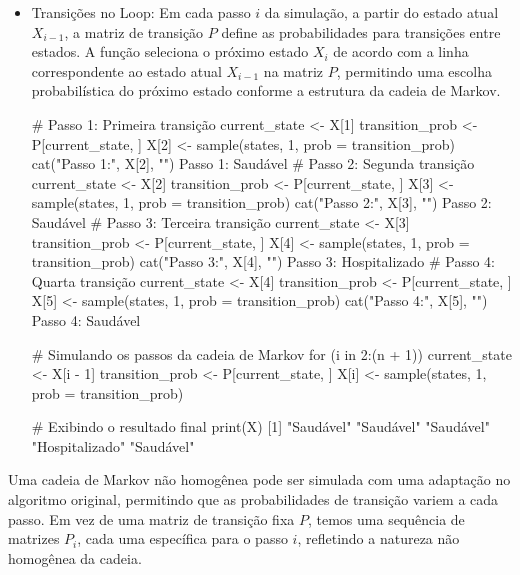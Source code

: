 \documentclass[12pt, a4paper, openany]{book}
\numberwithin{equation}{chapter}
\numberwithin{table}{chapter}
\numberwithin{figure}{chapter}
\theoremstyle{break}
\begin{document}
\begin{itemize}
   
   \item Transições no Loop: Em cada passo \( i \) da simulação, a partir do estado atual \( X_{i-1} \), a matriz de transição \( P \) define as probabilidades para transições entre estados. A função seleciona o próximo estado \( X_i \) de acordo com a linha correspondente ao estado atual \( X_{i-1} \) na matriz \( P \), permitindo uma escolha probabilística do próximo estado conforme a estrutura da cadeia de Markov. 



\begin{RCodeBox}

# Passo 1: Primeira transição
current_state <- X[1]
transition_prob <- P[current_state, ]
X[2] <- sample(states, 1, prob = transition_prob)
cat("Passo 1:", X[2], "\n")
Passo 1: Saudável 
# Passo 2: Segunda transição
current_state <- X[2]
transition_prob <- P[current_state, ]
X[3] <- sample(states, 1, prob = transition_prob)
cat("Passo 2:", X[3], "\n")
Passo 2: Saudável 
# Passo 3: Terceira transição
current_state <- X[3]
transition_prob <- P[current_state, ]
X[4] <- sample(states, 1, prob = transition_prob)
cat("Passo 3:", X[4], "\n")
Passo 3: Hospitalizado 
# Passo 4: Quarta transição
current_state <- X[4]
transition_prob <- P[current_state, ]
X[5] <- sample(states, 1, prob = transition_prob)
cat("Passo 4:", X[5], "\n")
Passo 4: Saudável 

\end{RCodeBox}




\begin{RCodeBox}

# Simulando os passos da cadeia de Markov
for (i in 2:(n + 1)) {
  current_state <- X[i - 1]
  transition_prob <- P[current_state, ]
  X[i] <- sample(states, 1, prob = transition_prob)
}

# Exibindo o resultado final
print(X)
[1] "Saudável"      "Saudável"      "Saudável"      "Hospitalizado" "Saudável" 


\end{RCodeBox}

\end{itemize}







Uma cadeia de Markov não homogênea pode ser simulada com uma adaptação no algoritmo original, permitindo que as probabilidades de transição variem a cada passo. Em vez de uma matriz de transição fixa \( P \), temos uma sequência de matrizes \( P_i \), cada uma específica para o passo \( i \), refletindo a natureza não homogênea da cadeia.
\end{document}
